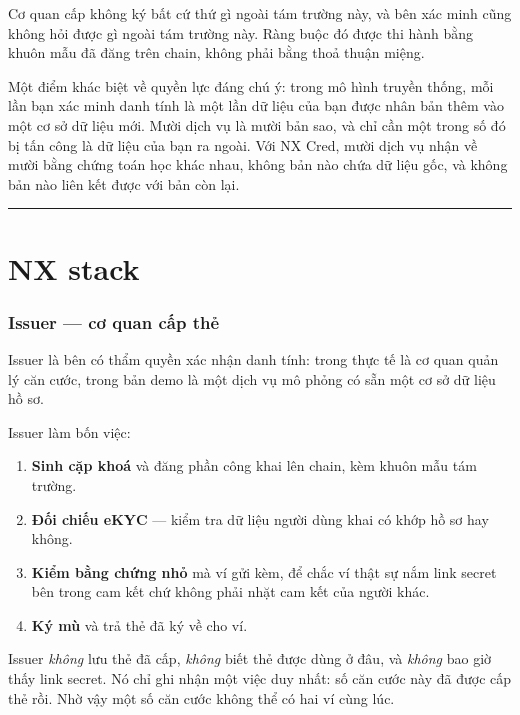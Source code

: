 \documentclass[a4paper,11pt]{article}
\begin{document}
Cơ quan cấp không ký bất cứ thứ gì ngoài tám trường này, và bên xác minh cũng không hỏi
được gì ngoài tám trường này. Ràng buộc đó được thi hành bằng khuôn mẫu đã đăng trên chain,
không phải bằng thoả thuận miệng.

Một điểm khác biệt về quyền lực đáng chú ý: trong mô hình truyền thống, mỗi lần bạn xác
minh danh tính là một lần dữ liệu của bạn được nhân bản thêm vào một cơ sở dữ liệu mới.
Mười dịch vụ là mười bản sao, và chỉ cần một trong số đó bị tấn công là dữ liệu của bạn ra
ngoài. Với NX Cred, mười dịch vụ nhận về mười bằng chứng toán học khác nhau, không bản nào
chứa dữ liệu gốc, và không bản nào liên kết được với bản còn lại.

\vspace{4mm}
\hrule
\vspace{6mm}

\part*{\sffamily NX stack}

\section{Issuer --- cơ quan cấp thẻ}

Issuer là bên có thẩm quyền xác nhận danh tính: trong thực tế là cơ quan quản lý căn cước,
trong bản demo là một dịch vụ mô phỏng có sẵn một cơ sở dữ liệu hồ sơ.

Issuer làm bốn việc:

\begin{enumerate}[leftmargin=1.4em,itemsep=4pt]
  \item \textbf{Sinh cặp khoá} và đăng phần công khai lên chain, kèm khuôn mẫu tám trường.
  \item \textbf{Đối chiếu eKYC} --- kiểm tra dữ liệu người dùng khai có khớp hồ sơ hay không.
  \item \textbf{Kiểm bằng chứng nhỏ} mà ví gửi kèm, để chắc ví thật sự nắm link secret bên
        trong cam kết chứ không phải nhặt cam kết của người khác.
  \item \textbf{Ký mù} và trả thẻ đã ký về cho ví.
\end{enumerate}

Issuer \emph{không} lưu thẻ đã cấp, \emph{không} biết thẻ được dùng ở đâu, và \emph{không}
bao giờ thấy link secret. Nó chỉ ghi nhận một việc duy nhất: số căn cước này đã được cấp
thẻ rồi. Nhờ vậy một số căn cước không thể có hai ví cùng lúc.
\end{document}
